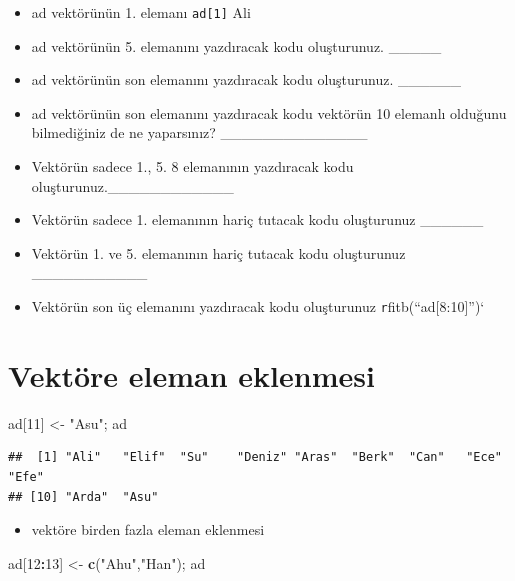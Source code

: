 \documentclass[
  oneside]{book}
\newenvironment{Shaded}{\begin{snugshade}}{\end{snugshade}}
\newcommand{\DecValTok}[1]{\textcolor[rgb]{0.00,0.00,0.81}{#1}}
\newcommand{\FunctionTok}[1]{\textcolor[rgb]{0.13,0.29,0.53}{\textbf{#1}}}
\newcommand{\NormalTok}[1]{#1}
\newcommand{\OtherTok}[1]{\textcolor[rgb]{0.56,0.35,0.01}{#1}}
\newcommand{\SpecialCharTok}[1]{\textcolor[rgb]{0.81,0.36,0.00}{\textbf{#1}}}
\newcommand{\StringTok}[1]{\textcolor[rgb]{0.31,0.60,0.02}{#1}}
\providecommand{\tightlist}{%
  \setlength{\itemsep}{0pt}\setlength{\parskip}{0pt}}
\begin{document}
\begin{itemize}
\item
  ad vektörünün 1. elemanı \texttt{ad{[}1{]}} Ali
\item
  ad vektörünün 5. elemanını yazdıracak kodu oluşturunuz. \_\_\_\_\_
\item
  ad vektörünün son elemanını yazdıracak kodu oluşturunuz. \_\_\_\_\_\_
\item
  ad vektörünün son elemanını yazdıracak kodu vektörün 10 elemanlı olduğunu bilmediğiniz de ne yaparsınız? \_\_\_\_\_\_\_\_\_\_\_\_\_\_
\item
  Vektörün sadece 1., 5. 8 elemanının yazdıracak kodu oluşturunuz.\_\_\_\_\_\_\_\_\_\_\_\_
\item
  Vektörün sadece 1. elemanının hariç tutacak kodu oluşturunuz \_\_\_\_\_\_
\item
  Vektörün 1. ve 5. elemanının hariç tutacak kodu oluşturunuz \_\_\_\_\_\_\_\_\_\_\_
\item
  Vektörün son üç elemanını yazdıracak kodu oluşturunuz \texttt{r}fitb(``ad{[}8:10{]}'')`
\end{itemize}

\hypertarget{vektuxf6re-eleman-eklenmesi}{%
\section{Vektöre eleman eklenmesi}\label{vektuxf6re-eleman-eklenmesi}}

\begin{Shaded}
\begin{Highlighting}[]
\NormalTok{ad[}\DecValTok{11}\NormalTok{] }\OtherTok{\textless{}{-}} \StringTok{"Asu"}\NormalTok{; ad}
\end{Highlighting}
\end{Shaded}

\begin{verbatim}
##  [1] "Ali"   "Elif"  "Su"    "Deniz" "Aras"  "Berk"  "Can"   "Ece"   "Efe"  
## [10] "Arda"  "Asu"
\end{verbatim}

\begin{itemize}
\tightlist
\item
  vektöre birden fazla eleman eklenmesi
\end{itemize}

\begin{Shaded}
\begin{Highlighting}[]
\NormalTok{ad[}\DecValTok{12}\SpecialCharTok{:}\DecValTok{13}\NormalTok{] }\OtherTok{\textless{}{-}} \FunctionTok{c}\NormalTok{(}\StringTok{"Ahu"}\NormalTok{,}\StringTok{"Han"}\NormalTok{); ad}
\end{Highlighting}
\end{Shaded}
\end{document}
